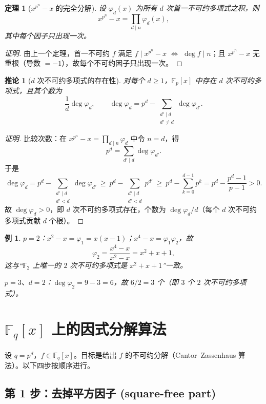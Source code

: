 \documentclass[11pt,a4paper]{ctexart}
\newtheorem*{theorem}{定理}
\newtheorem*{corollary}{推论}
\newtheorem*{example}{例}
\theoremstyle{remark}
\newcommand{\Fp}{\mathbb{F}_p}
\begin{document}
\begin{theorem}[$x^{p^{n}}-x$ 的完全分解]
设 $\varphi_{d}(x)$ 为所有 $d$ 次首一不可约多项式之积，则
\[
x^{p^{n}}-x=\prod_{d\mid n}\varphi_{d}(x),
\]
其中每个因子只出现一次。
\end{theorem}

\begin{proof}[证明]
由上一个定理，首一不可约 $f$ 满足 $f\mid x^{p^{n}}-x$ $\iff$ $\deg f\mid n$；且 $x^{p^{n}}-x$ 无重根（导数 $=-1$），故每个不可约因子只出现一次。
\end{proof}

\begin{corollary}[$d$ 次不可约多项式的存在性]
对每个 $d\ge1$，$\Fp[x]$ 中存在 $d$ 次不可约多项式，且其个数为
\[
\frac{1}{d}\deg\varphi_{d},\qquad
\deg\varphi_{d}=p^{d}-\sum_{\substack{d'\mid d\\ d'\neq d}}\deg\varphi_{d'} .
\]
\end{corollary}

\begin{proof}[证明]
比较次数：在 $x^{p^{n}}-x=\prod_{d\mid n}\varphi_{d}$ 中令 $n=d$，得
\[
p^{d}=\sum_{d'\mid d}\deg\varphi_{d'} .
\]
于是
\[
\deg\varphi_{d}
=p^{d}-\sum_{\substack{d'\mid d\\ d'<d}}\deg\varphi_{d'}
\ \ge\ p^{d}-\sum_{\substack{d'\mid d\\ d'<d}}p^{d'}
\ \ge\ p^{d}-\sum_{k=0}^{d-1}p^{k}
=p^{d}-\frac{p^{d}-1}{p-1}>0 .
\]
故 $\deg\varphi_{d}>0$，即 $d$ 次不可约多项式存在，个数为 $\deg\varphi_{d}/d$（每个 $d$ 次不可约多项式贡献 $d$ 个根）。
\end{proof}

\begin{example}
$p=2$：$x^{2}-x=\varphi_{1}=x(x-1)$；$x^{4}-x=\varphi_{1}\varphi_{2}$，故
\[
\varphi_{2}=\frac{x^{4}-x}{x^{2}-x}=x^{2}+x+1,
\]
这与“$\mathbb{F}_{2}$ 上唯一的 $2$ 次不可约多项式是 $x^{2}+x+1$”一致。

$p=3$、$d=2$：$\deg\varphi_{2}=9-3=6$，故 $6/2=3$ 个（即 $3$ 个 $2$ 次不可约多项式）。
\end{example}

\section*{$\mathbb{F}_{q}[x]$ 上的因式分解算法}

设 $q=p^{d}$，$f\in\mathbb{F}_{q}[x]$。目标是给出 $f$ 的不可约分解（Cantor--Zassenhaus 算法）。以下四步按顺序进行。

\subsection*{第 1 步：去掉平方因子 (square-free part)}
\end{document}
